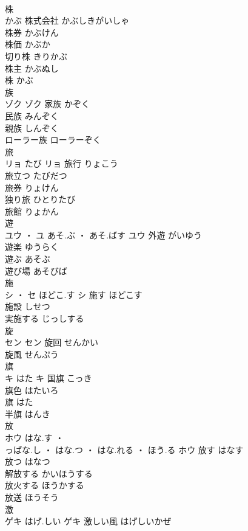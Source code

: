 \documentclass[8pt]{extreport}
\begin{document}
\begin{CJK}{UTF8}{min}
\\	株	
\\	かぶ		株式会社	かぶしきがいしゃ	
\\	株券	かぶけん	
\\	株価	かぶか	
\\	切り株	きりかぶ	
\\	株主	かぶぬし	
\\	株	かぶ	
\\	族	
\\	ゾク		ゾク	家族	かぞく	
\\	民族	みんぞく	
\\	親族	しんぞく	
\\	ローラー族	ローラーぞく	
\\	旅	
\\	リョ	たび	リョ	旅行	りょこう	
\\	旅立つ	たびだつ	
\\	旅券	りょけん	
\\	独り旅	ひとりたび	
\\	旅館	りょかん	
\\	遊	
\\	ユウ ・ ユ	あそ.ぶ ・ あそ.ばす	ユウ	外遊	がいゆう	
\\	遊楽	ゆうらく	
\\	遊ぶ	あそぶ	
\\	遊び場	あそびば	
\\	施	
\\	シ ・ セ	ほどこ.す	シ	施す	ほどこす	
\\	施設	しせつ	
\\	実施する	じっしする	
\\	旋	
\\	セン		セン	旋回	せんかい	
\\	旋風	せんぷう	
\\	旗	
\\	キ	はた	キ	国旗	こっき	
\\	旗色	はたいろ	
\\	旗	はた	
\\	半旗	はんき	
\\	放	
\\	ホウ	はな.す ・ 
\\	っぱな.し ・ はな.つ ・ はな.れる ・ ほう.る	ホウ	放す	はなす	
\\	放つ	はなつ	
\\	解放する	かいほうする	
\\	放火する	ほうかする	
\\	放送	ほうそう	
\\	激	
\\	ゲキ	はげ.しい	ゲキ	激しい風	はげしいかぜ	

\end{CJK}
\end{document}
